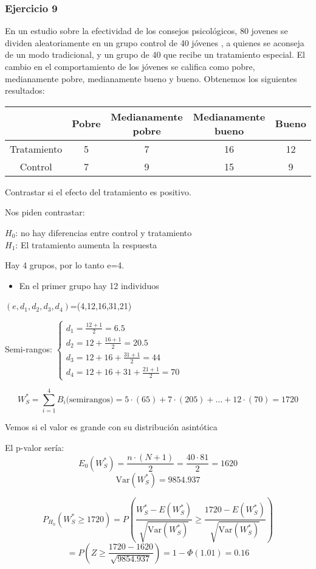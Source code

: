 \subsubsection*{Ejercicio 9}
En un  estudio sobre la efectividad de los consejos psicológicos, 80 jovenes se dividen aleatoriamente en un grupo control de 40 jóvenes
, a quienes se aconseja de un modo tradicional, y un grupo de 40 que recibe un tratamiento especial. El cambio en el comportamiento de los jóvenes se califica como
pobre, medianamente pobre, medianamente bueno y bueno. Obtenemos los siguientes resultados:
\begin{table}[h!]
    \centering
    \begin{tabular}{|c|c|c|c|c|}
    \hline
    & Pobre & Medianamente pobre & Medianamente bueno & Bueno \\ \hline
    Tratamiento & 5 & 7 & 16 & 12 \\ \hline
    Control     & 7 & 9 & 15 & 9  \\ \hline
    \end{tabular}
\end{table}

Contrastar si el efecto del tratamiento es positivo.

Nos piden contrastar:

\begin{center}
    $H_0$: no hay diferencias entre control y tratamiento \\
    $H_1$: El tratamiento aumenta la respuesta
\end{center}

Hay 4 grupos, por lo tanto e=4.

\begin{itemize}
    \item En el primer grupo hay 12 individuos
\end{itemize}

$(e,d_1,d_2,d_3,d_4)$=(4,12,16,31,21)

Semi-rangos:
\(
\left\{
\begin{matrix}
    d_1=\frac{12+1}{2}=6.5 \\
    d_2=12+\frac{16+1}{2}=20.5 \\
    d_3=12+16+\frac{31+1}{2}=44 \\
    d_4=12+16+31+\frac{21+1}{2}=70
\end{matrix}
\right.
\)

\[
W_S^*=\sum_{i=1}^{4} B_i \text{(semirangos)}=5\cdot (65)+ 7\cdot (205)+ \dots+12 \cdot (70)=1720
\]

Vemos si el valor es grande con su distribución asintótica

El p-valor sería:
\[
E_0(W_S^*) = \frac{n \cdot (N+1)}{2} = \frac{40 \cdot 81}{2} = 1620
\]
\[
\text{Var}(W_S^*) = 9854.937
\]

\[
P_{H_0}(W_S^* \geq 1720) = P \left( \frac{W_S^* - E(W_S^*)}{\sqrt{\text{Var}(W_S^*)}} \geq \frac{1720 - E(W_S^*)}{\sqrt{\text{Var}(W_S^*)}} \right)
\]
\[
= P \left(Z \geq \frac{1720 - 1620}{\sqrt{9854.937}} \right) = 1 - \Phi(1.01) = 0.16
\]
